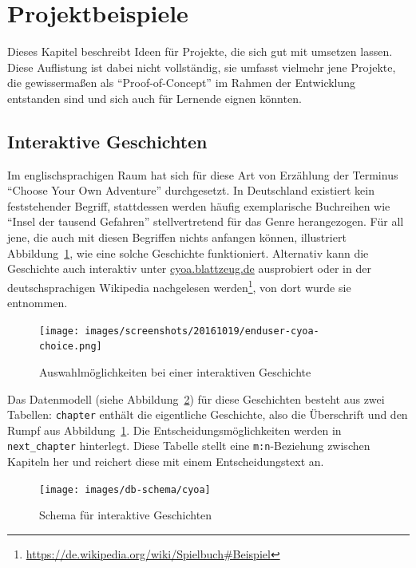 \section{Projektbeispiele}
\label{sec:project-examples}

Dieses Kapitel beschreibt Ideen für Projekte, die sich gut mit \idename{} umsetzen lassen. Diese Auflistung ist dabei nicht vollständig, sie umfasst vielmehr jene Projekte, die gewissermaßen als "`Proof-of-Concept"' im Rahmen der Entwicklung entstanden sind und sich auch für Lernende eignen könnten.

\subsection{Interaktive Geschichten}
\label{sec:project-cyoa}

Im englischsprachigen Raum hat sich für diese Art von Erzählung der Terminus "`Choose Your Own Adventure"' durchgesetzt. In Deutschland existiert kein feststehender Begriff, stattdessen werden häufig exemplarische Buchreihen wie "`Insel der tausend Gefahren"' stellvertretend für das Genre herangezogen. Für all jene, die auch mit diesen Begriffen nichts anfangen können, illustriert Abbildung~\ref{fig:enduser-cyoa-choice}, wie eine solche Geschichte funktioniert. Alternativ kann die Geschichte auch interaktiv unter \href{http://cyoa.blattzeug.de/}{cyoa.blattzeug.de} ausprobiert oder in der deutschsprachigen Wikipedia nachgelesen werden\footnote{\url{https://de.wikipedia.org/wiki/Spielbuch\#Beispiel}}, von dort wurde sie entnommen.

\begin{figure}[h]
  \centering \texttt{[image: images/screenshots/20161019/enduser-cyoa-choice.png]}
  \caption{Auswahlmöglichkeiten bei einer interaktiven Geschichte}
  \label{fig:enduser-cyoa-choice}
\end{figure}

Das Datenmodell (siehe Abbildung~\ref{fig:project-cyoa-schema}) für diese Geschichten besteht aus zwei Tabellen: \texttt{chapter} enthält die eigentliche Geschichte, also die Überschrift und den Rumpf aus Abbildung~\ref{fig:enduser-cyoa-choice}. Die Entscheidungsmöglichkeiten werden in \texttt{next\_chapter} hinterlegt. Diese Tabelle stellt eine \texttt{m:n}-Beziehung zwischen Kapiteln her und reichert diese mit einem Entscheidungstext an.

\begin{figure}[h]
  \centering \texttt{[image: images/db-schema/cyoa]}
  \caption{Schema für interaktive Geschichten}
  \label{fig:project-cyoa-schema}
\end{figure}


